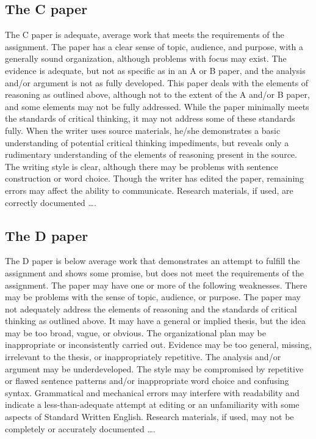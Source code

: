 \documentclass[12pt, hidelinks]{article} %
\begin{document}
\subsection{The C paper}
The C paper is adequate, average work that meets the requirements of the assignment. The paper has a clear sense of topic, audience, and purpose, with a generally sound organization, although problems with focus may exist. The evidence is adequate, but not as specific as in an A or B paper, and the analysis and/or argument is not as fully developed. This paper deals with the elements of reasoning as outlined above, although not to the extent of the A and/or B paper, and some elements may not be fully addressed. While the paper minimally meets the standards of critical thinking, it may not address some of these standards fully. When the writer uses source materials, he/she demonstrates a basic understanding of potential critical thinking impediments, but reveals only a rudimentary understanding of the elements of reasoning present in the source. The writing style is clear, although there may be problems with sentence construction or word choice. Though the writer has edited the paper, remaining errors may affect the ability to communicate. Research materials, if used, are correctly documented \dots.

\subsection{The D paper}

The D paper is below average work that demonstrates an attempt to fulfill the assignment and shows some promise, but does not meet the requirements of the assignment. The paper may have one or more of the following weaknesses. There may be problems with the sense of topic, audience, or purpose. The paper may not adequately address the elements of reasoning and the standards of critical thinking as outlined above. It may have a general or implied thesis, but the idea may be too broad, vague, or obvious. The organizational plan may be inappropriate or inconsistently carried out. Evidence may be too general, missing, irrelevant to the thesis, or inappropriately repetitive. The analysis and/or argument may be underdeveloped. The style may be compromised by repetitive or flawed sentence patterns and/or inappropriate word choice and confusing syntax. Grammatical and mechanical errors may interfere with readability and indicate a less-than-adequate attempt at editing or an unfamiliarity with some aspects of Standard Written English. Research materials, if used, may not be completely or accurately documented \dots.
\end{document}
